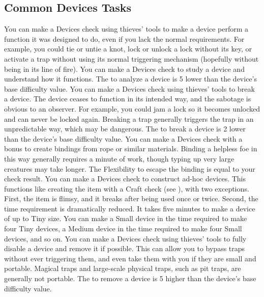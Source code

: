     \subsection{Common Devices Tasks}
         You can make a Devices check using thieves' tools to make a device perform a function it was designed to do, even if you lack the normal requirements.
        For example, you could tie or untie a knot, lock or unlock a lock without its key, or activate a trap without using its normal triggering mechanism (hopefully without being in its line of fire).
         You can make a Devices check to study a device and understand how it functions.
        The  to analyze a device is 5 lower than the device's base difficulty value.
         You can make a Devices check using thieves' tools to break a device.
        The device ceases to function in its intended way, and the sabotage is obvious to an observer.
        For example, you could jam a lock so it becomes unlocked and can never be locked again.
        Breaking a trap generally triggers the trap in an unpredictable way, which may be dangerous.
        The  to break a device is 2 lower than the device's base difficulty value.
         You can make a Devices check with a  bonus to create bindings from rope or similar materials.
        Binding a helpless foe in this way generally requires a minute of work, though typing up very large creatures may take longer.
        The Flexibility  to escape the binding is equal to your check result.
         You can make a Devices check to construct ad-hoc devices.
        This functions like creating the item with a Craft check (see ), with two exceptions.
        First, the item is flimsy, and it breaks after being used once or twice.
        Second, the time requirement is dramatically reduced.
        It takes five minutes to make a device of up to Tiny size.
        You can make a Small device in the time required to make four Tiny devices, a Medium device in the time required to make four Small devices, and so on.
         You can make a Devices check using thieves' tools to fully disable a device and remove it if possible.
        This can allow you to bypass traps without ever triggering them, and even take them with you if they are small and portable.
        Magical traps and large-scale physical traps, such as pit traps, are generally not portable.
        The  to remove a device is 5 higher than the device's base difficulty value.

